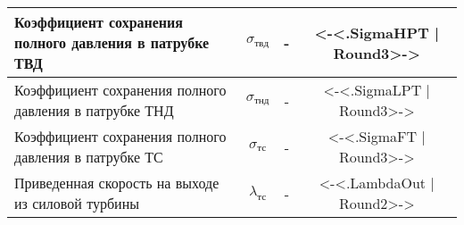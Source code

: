 \begin{center}
\begin{longtable}{|p{7cm}|c|c|c|}
		Коэффициент сохранения полного давления в патрубке ТВД & $\sigma_{твд}$ & - & <-<.SigmaHPT | Round3>-> \\ \hline
		Коэффициент сохранения полного давления в патрубке ТНД & $\sigma_{тнд}$ & - & <-<.SigmaLPT | Round3>-> \\ \hline
		Коэффициент сохранения полного давления в патрубке ТС & $\sigma_{тс}$ & - & <-<.SigmaFT | Round3>-> \\ \hline
		Приведенная скорость на выходе из силовой турбины & $\lambda_{тс}$ & - & <-<.LambdaOut | Round2>-> \\ \hline
	\end{longtable}
\end{center}
\clearpage

%